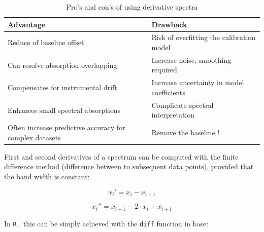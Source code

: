 \documentclass[12pt]{article}\usepackage{graphicx, color}
\newcommand{\R}{\texttt{R} }
\newcommand{\Rfunction}[1]{{\texttt{#1}}}
\newcommand{\Rpackage}[1]{{\mbox{\normalfont\textsf{#1}}}}
\begin{document}
\begin{table}[h]
\caption{Pro's and con's of using derivative spectra}
\centering
\begin{tabular}{l|l}
\hline
Advantage & Drawback  \\
\hline 
  Reduce of baseline offset & Risk of overfitting the calibration model \\
  Can resolve absorption overlapping & Increase noise, smoothing required \\
  Compensates for instrumental drift & Increase uncertainty in model coefficients  \\                                     
  Enhances small spectral absorptions & Complicate spectral interpretation \\
  Often increase predictive accuracy for complex datasets & Remove the baseline ! \\ 
\hline
\end{tabular}
\label{tab:der}
\end{table}

First and second derivatives of a spectrum can be computed with the finite difference method (difference between to subsequent data points), provided that the band width is constant: 

$$ x_i' = x_i - x_{i-1}$$

$$ x_i'' = x_{i-1} - 2 \cdot x_i + x_{i+1}$$

In \R, this can be simply achieved with the \Rfunction{diff} function in \Rpackage{base}: 
\end{document}
